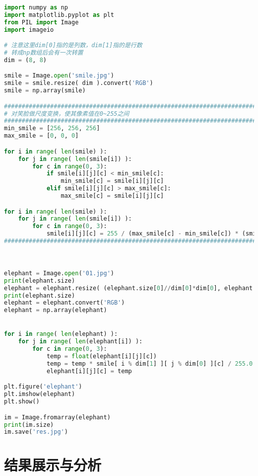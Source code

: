 \documentclass[UTF8]{ctexart}
\begin{document}
	\begin{lstlisting}[language=python,caption={boradcast.cpp},label={broadcast.cpp}]
import numpy as np
import matplotlib.pyplot as plt
from PIL import Image
import imageio

# 注意这里dim[0]指的是列数，dim[1]指的是行数
# 转成np数组后会有一次转置
dim = (8, 8)

smile = Image.open('smile.jpg')
smile = smile.resize( dim ).convert('RGB')
smile = np.array(smile)

#########################################################################
# 对笑脸做尺度变换，使其像素值在0~255之间
#########################################################################
min_smile = [256, 256, 256]
max_smile = [0, 0, 0]

for i in range( len(smile) ):
    for j in range( len(smile[i]) ):
        for c in range(0, 3):
            if smile[i][j][c] < min_smile[c]:
                min_smile[c] = smile[i][j][c]
            elif smile[i][j][c] > max_smile[c]:
                max_smile[c] = smile[i][j][c]

for i in range( len(smile) ):
    for j in range( len(smile[i]) ):
        for c in range(0, 3):
            smile[i][j][c] = 255 / (max_smile[c] - min_smile[c]) * (smile[i][j][c] - min_smile[c])
#########################################################################



elephant = Image.open('01.jpg')
print(elephant.size)
elephant = elephant.resize( (elephant.size[0]//dim[0]*dim[0], elephant.size[1]//dim[1]*dim[1]) )
print(elephant.size)
elephant = elephant.convert('RGB')
elephant = np.array(elephant)


for i in range( len(elephant) ):
    for j in range( len(elephant[i]) ):
        for c in range(0, 3):
            temp = float(elephant[i][j][c])
            temp = temp * smile[ i % dim[1] ][ j % dim[0] ][c] / 255.0
            elephant[i][j][c] = temp

plt.figure('elephant')
plt.imshow(elephant)
plt.show()

im = Image.fromarray(elephant)
print(im.size)
im.save('res.jpg')
	\end{lstlisting}

	\section{结果展示与分析}\label{results}
\end{document}
